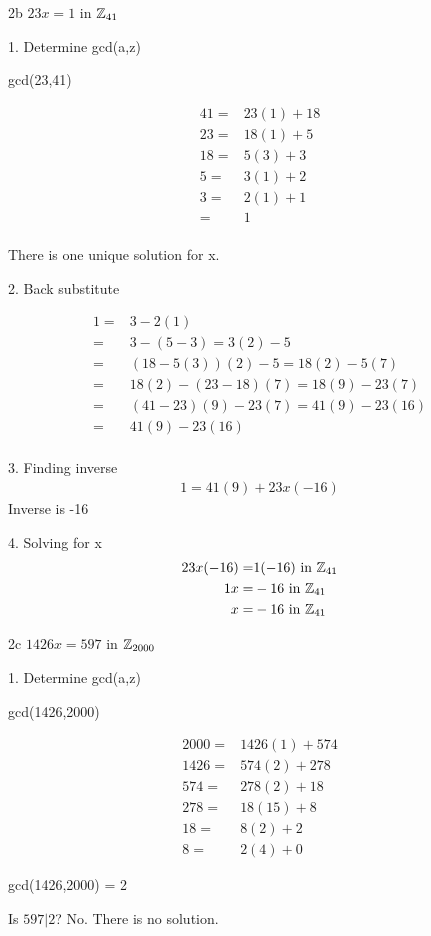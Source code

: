 \begin{question}{2b}
$23x = 1$ in $\mathbb{Z}_{41}$

1. Determine gcd(a,z)

gcd(23,41)

\begin{align*}
41 =& 23(1) +18 \\
23 =& 18(1) +5 \\
18 =& 5(3) + 3 \\
5 =& 3(1) +2 \\
3 =& 2(1) +1 \\
=& 1 \\
\end{align*}

There is one unique solution for x.

2. Back substitute

\begin{align*}
1 =& 3 - 2(1) \\
=& 3-(5-3) = 3(2)-5\\
=& (18-5(3))(2)-5 = 18(2)-5(7)\\ 
=& 18(2)-(23-18)(7) = 18(9)-23(7)\\
=& (41-23)(9)-23(7) = 41(9)-23(16)\\
=& 41(9)-23(16)\\ 
\end{align*}

3. Finding inverse
\begin{align*}
1 = 41(9) + 23x(-16)
\end{align*}
Inverse is -16

4. Solving for x
\begin{align*}
23x(-16) =& 1(-16) \textrm{ in } \mathbb{Z}_{41}\\
1x =& -16 \textrm{ in } \mathbb{Z}_{41}\\
x =& -16 \textrm{ in } \mathbb{Z}_{41}
\end{align*}
\end{question}

\begin{question}{2c}
$1426x = 597$ in $\mathbb{Z}_{2000}$

1. Determine gcd(a,z)

gcd(1426,2000)

\begin{align*}
2000 =& 1426(1) + 574 \\
1426 =& 574(2) + 278 \\
574 =& 278(2) + 18 \\
278 =& 18(15) + 8 \\
18 =& 8(2) + 2 \\
8 =& 2(4) + 0
\end{align*}

gcd(1426,2000) = 2

Is $597|2$? No. There is no solution.
\end{question}


